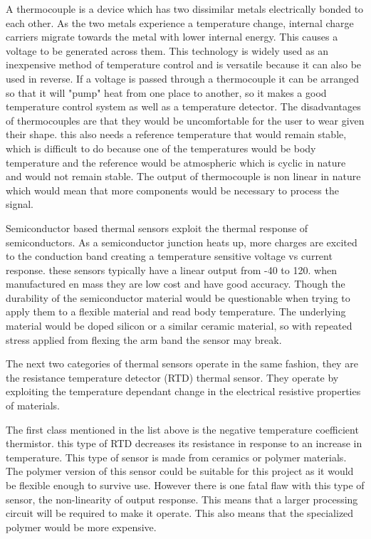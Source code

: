 \documentclass[12pt,a4paper]{report}
\begin{document}
A thermocouple is a device which has two dissimilar metals electrically bonded to each other. As the two metals experience a temperature change, internal charge carriers migrate towards the metal with lower internal energy. This causes a voltage to be generated across them. This technology is widely used as an inexpensive method of temperature control and is versatile because it can also be used in reverse. If a voltage is passed through a thermocouple it can be arranged so that it will "pump" heat from one place to another, so it makes a good temperature control system as well as a temperature detector. The disadvantages of thermocouples are that they would be uncomfortable for the user to wear given their shape. this also needs a reference temperature that would remain stable, which is difficult to do because one of the temperatures would be body temperature and the reference would be atmospheric which is cyclic in nature and would not remain stable. The output of thermocouple is non linear in nature which would mean that more components would be necessary to process the signal.\par


Semiconductor based thermal sensors exploit the thermal response of semiconductors. As a semiconductor junction heats up, more charges are excited to the conduction band creating a temperature sensitive voltage vs current response. these sensors typically have a linear output from -40\textcelsius{} to 120\textcelsius{}. when manufactured en mass they are low cost and have good accuracy. Though the durability of the semiconductor material would be questionable when trying to apply them to a flexible material and read body temperature. The underlying material would be doped silicon or a similar ceramic material, so with repeated stress applied from flexing the arm band the sensor may break.\par

The next two categories of thermal sensors operate in the same fashion, they are the resistance temperature detector (RTD) thermal sensor. They operate by exploiting the temperature dependant change in  the electrical resistive properties of materials.\par

The first class mentioned in the list above is the negative temperature coefficient thermistor. this type of RTD decreases its resistance in response to an increase in temperature. This type of sensor is made from ceramics or polymer materials. The polymer version of this sensor could be suitable for this project as it would be flexible enough to survive use. However there is one fatal flaw with this type of sensor, the non-linearity of output response. This means that a larger processing circuit will be required to make it operate. This also means that the specialized polymer would be more expensive.\par
\end{document}

